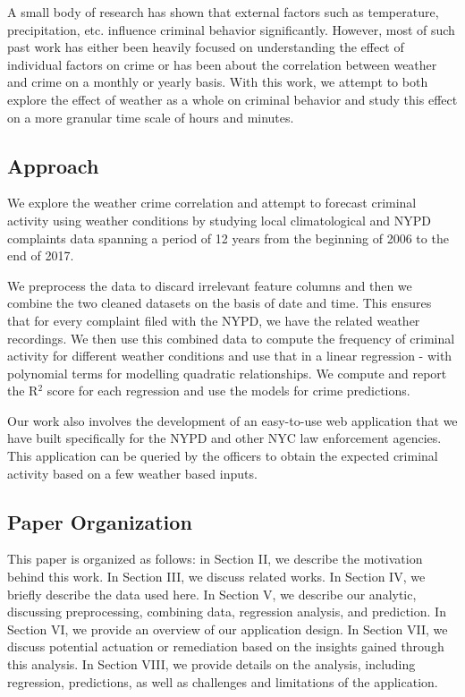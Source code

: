 \documentclass[conference]{IEEEtran}
\begin{document}
A small body of research has shown that external factors such as temperature, precipitation, etc. influence criminal behavior significantly.
However, most of such past work has either been heavily focused on understanding the effect of individual factors on crime or has been about the correlation between weather and crime on a monthly or yearly basis.
With this work, we attempt to both explore the effect of weather as a whole on criminal behavior and study this effect on a more granular time scale of hours and minutes.

\subsection{Approach}
We explore the weather crime correlation and attempt to forecast criminal activity using weather conditions by studying local climatological and NYPD complaints data spanning a period of 12 years from the beginning of 2006 to the end of 2017.

We preprocess the data to discard irrelevant feature columns and then we combine the two cleaned datasets on the basis of date and time.
This ensures that for every complaint filed with the NYPD, we have the related weather recordings.
We then use this combined data to compute the frequency of criminal activity for different weather conditions and use that in a linear regression - with polynomial terms for modelling quadratic relationships.
We compute and report the R$^{2}$ score for each regression and use the models for crime predictions.

Our work also involves the development of an easy-to-use web application that we have built specifically for the NYPD and other NYC law enforcement agencies.
This application can be queried by the officers to obtain the expected criminal activity based on a few weather based inputs.

\subsection{Paper Organization}
This paper is organized as follows: in Section II, we describe the motivation behind this work. 
In Section III, we discuss related works.
In Section IV, we briefly describe the data used here.
In Section V, we describe our analytic, discussing preprocessing, combining data, regression analysis, and prediction.
In Section VI, we provide an overview of our application design.
In Section VII, we discuss potential actuation or remediation based on the insights gained through this analysis.
In Section VIII, we provide details on the analysis, including regression, predictions, as well as challenges and limitations of the application.
\end{document}
